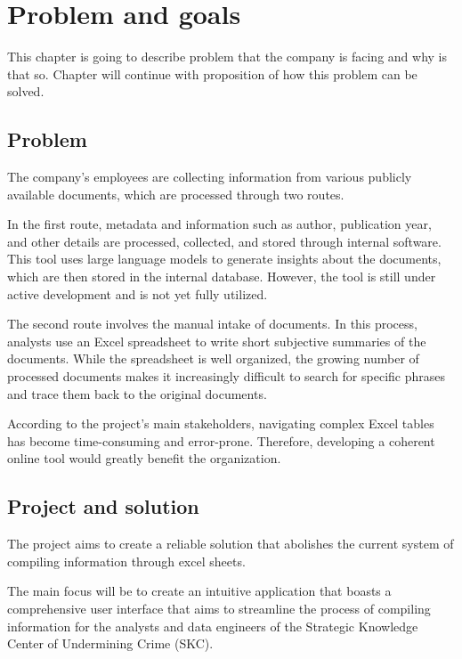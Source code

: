 \section{Problem and goals}
\label{sec:Problem-and-goals}

This chapter is going to describe problem that the company is facing and why is that so. Chapter will continue with proposition of how this problem can be solved. 

\subsection{Problem}
\label{subsec:Problem}
The company’s employees are collecting information from various publicly available documents, which are processed through two routes.

In the first route, metadata and information such as author, publication year, and other details are processed, collected, and stored through internal software. This tool uses large language models to generate insights about the documents, which are then stored in the internal database. However, the tool is still under active development and is not yet fully utilized.

The second route involves the manual intake of documents. In this process, analysts use an Excel spreadsheet to write short subjective summaries of the documents. While the spreadsheet is well organized, the growing number of processed documents makes it increasingly difficult to search for specific phrases and trace them back to the original documents.

According to the project’s main stakeholders, navigating complex Excel tables has become time-consuming and error-prone. Therefore, developing a coherent online tool would greatly benefit the organization.

\subsection{Project and solution}
\label{subsec:Project-or-Solution}

The project aims to create a reliable solution that abolishes the current system of compiling information through excel sheets. 

The main focus will be to create an intuitive application that boasts a comprehensive user interface that aims to streamline the process of compiling information for the analysts and data engineers of the Strategic Knowledge Center of Undermining Crime (SKC).
